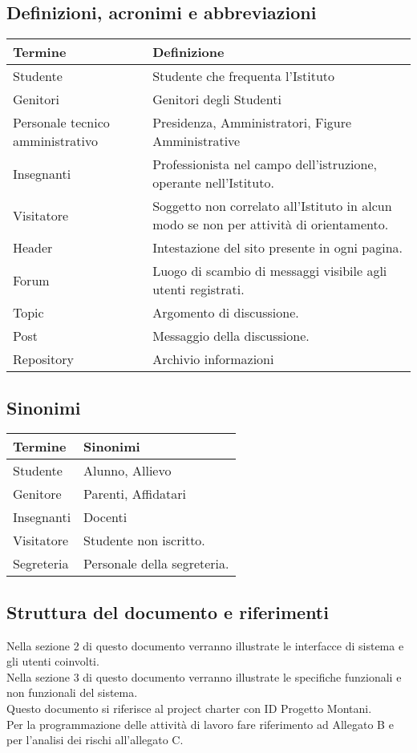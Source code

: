 \documentclass{article}
\begin{document}
	
	\subsection{\textbf{Definizioni, acronimi e abbreviazioni}}
	\begin{tabular}{ |p{3cm}|p{8cm}|  }
	\hline
	\textbf{Termine}& \textbf{Definizione}\\
	\hline
	Studente   & Studente che frequenta l'Istituto  \\
	\hline
	Genitori & Genitori degli Studenti \\
	\hline
	Personale tecnico amministrativo & Presidenza, Amministratori, Figure Amministrative \\
	\hline
	Insegnanti   &  Professionista nel campo dell'istruzione, operante nell'Istituto.  \\
	\hline
	Visitatore  & Soggetto non correlato all'Istituto in alcun modo se non per attività di orientamento. \\	
	\hline
	Header & Intestazione del sito presente in ogni pagina. \\
	\hline
	Forum & Luogo di scambio di messaggi visibile agli utenti registrati.\\
		\hline
	Topic & Argomento di discussione.\\
		\hline
	Post & Messaggio della discussione. \\
		\hline
	Repository & Archivio informazioni\\
	\hline
\end{tabular}
	
	\subsection{\textbf{Sinonimi}}
\begin{tabular}{ |p{3cm}|p{8cm}|  }
	\hline
	\textbf{Termine}& \textbf{Sinonimi}\\
	\hline
	Studente   & Alunno, Allievo  \\
	\hline
	Genitore   &  Parenti, Affidatari \\
	\hline
	Insegnanti  & Docenti\\	
	\hline
	Visitatore   & Studente non iscritto.  \\
	\hline
	Segreteria   & Personale della segreteria.  \\
\hline
\end{tabular}
	
	\subsection{\textbf{Struttura del documento e riferimenti}}
	Nella sezione 2 di questo documento verranno illustrate le interfacce di sistema e gli utenti coinvolti.\\
	Nella sezione 3 di questo documento verranno illustrate le specifiche funzionali e non funzionali del sistema.\\
	Questo documento si riferisce al project charter con ID Progetto Montani.\\
	Per la programmazione delle attività di lavoro fare riferimento ad Allegato B e per l'analisi dei rischi all'allegato C.\\
	
\end{document}
